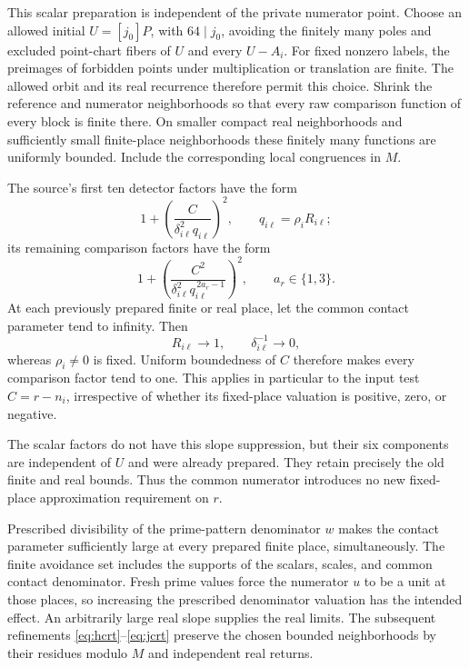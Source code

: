 \documentclass[11pt]{article}
\begin{document}
This scalar preparation is independent of the private numerator
point. Choose an allowed initial \(U=[j_0]P\), with \(64\mid j_0\),
avoiding the finitely many poles and excluded point-chart fibers
of \(U\) and every \(U-A_i\). For fixed nonzero labels, the
preimages of forbidden points under multiplication or translation
are finite. The allowed orbit and its real recurrence therefore
permit this choice. Shrink the reference and numerator
neighborhoods so that every raw comparison function of every
block is finite there. On smaller compact real neighborhoods
and sufficiently small finite-place neighborhoods these
finitely many functions are uniformly bounded. Include the
corresponding local congruences in \(M\).

The source's first ten detector factors have the form
\[
             1+\left(\frac{C}{\delta_{i\ell}^2q_{i\ell}}\right)^2,
             \qquad q_{i\ell}=\rho_iR_{i\ell};
\]
its remaining comparison factors have the form
\[
       1+\left(\frac{C^2}
        {\delta_{i\ell}^2q_{i\ell}^{\,2a_r-1}}\right)^2,
                 \qquad a_r\in\{1,3\}.
\]
At each previously prepared finite or real place, let the common
contact parameter tend to infinity. Then
\[
             R_{i\ell}\longrightarrow1,\qquad
             \delta_{i\ell}^{-1}\longrightarrow0,
\]
whereas \(\rho_i\ne0\) is fixed. Uniform boundedness of \(C\)
therefore makes every comparison factor tend to one. This
applies in particular to the input test \(C=r-n_i\), irrespective
of whether its fixed-place valuation is positive, zero, or
negative.

The scalar factors do not have this slope suppression, but their
six components are independent of \(U\) and were already
prepared. They retain precisely the old finite and real bounds.
Thus the common numerator introduces no new fixed-place
approximation requirement on \(r\).

Prescribed divisibility of the prime-pattern denominator \(w\)
makes the contact parameter sufficiently large at every prepared
finite place, simultaneously. The finite avoidance set includes
the supports of the scalars, scales, and common contact
denominator. Fresh prime values force the numerator \(u\) to
be a unit at those places, so increasing the prescribed
denominator valuation has the intended effect. An arbitrarily
large real slope supplies the real limits. The subsequent
refinements \eqref{eq:hcrt}--\eqref{eq:jcrt} preserve the
chosen bounded neighborhoods by their residues modulo \(M\)
and independent real returns.
\end{document}
